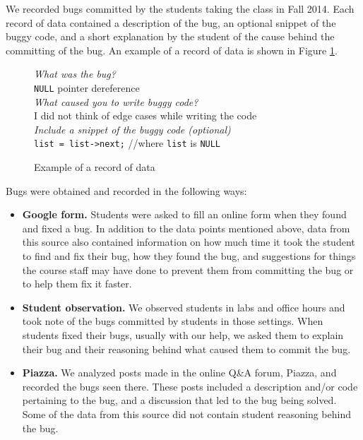 \documentclass{sig-alternate}
\begin{document}
We recorded bugs committed by the students taking the class in Fall 2014. Each record of data contained a description of the bug, an optional snippet of the buggy code, and a short explanation by the student of the cause behind the committing of the bug. An example of a record of data is shown in Figure \ref{fig:record}.\\

\begin{figure}
\begin{framed}
\emph{What was the bug?}\\
\verb|NULL| pointer dereference\\

\emph{What caused you to write buggy code?}\\
 I did not think of edge cases while writing the code\\

\emph{Include a snippet of the buggy code (optional)}\\
\verb|list = list->next;| //where \verb|list| is \verb|NULL|
\end{framed}
\vspace{-0.1in}
\caption{Example of a record of data}
\label{fig:record}
\end{figure}

Bugs were obtained and recorded in the following ways:
\begin{itemize}
\item{\textbf{Google form.} Students were asked to fill an online form when they found and fixed a bug. In addition to the data points mentioned above, data from this source also contained information on how much time it took the student to find and fix their bug, how they found the bug, and suggestions for things the course staff may have done to prevent them from committing the bug or to help them fix it faster.}

\item{\textbf{Student observation.} We observed students in labs and office hours and took note of the bugs committed by students in those settings. When students fixed their bugs, usually with our help, we asked them to explain their bug and their reasoning behind what caused them to commit the bug.}
\item{\textbf{Piazza.} We analyzed posts made in the online Q\&A forum, Piazza, and recorded the bugs seen there. These posts included a description and/or code pertaining to the bug, and a discussion that led to the bug being solved. Some of the data from this source did not contain student reasoning behind the bug.}
\end{itemize}
\end{document}
